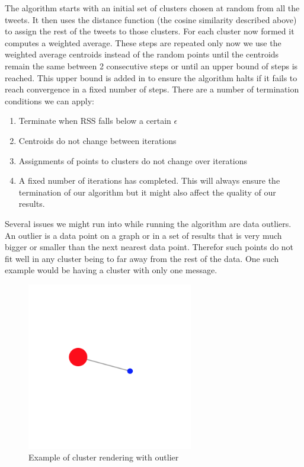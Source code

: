 The algorithm starts with an initial set of clusters chosen at random from all the tweets. It then uses the distance function (the cosine similarity described above) to assign the rest of the tweets to those clusters. For each cluster now formed it computes a weighted average. These steps are repeated only now we use the weighted average centroids instead of the random points until the centroids remain the same between 2 consecutive steps or until an upper bound of steps is reached. This upper bound is added in to ensure the algorithm halts if it fails to reach convergence in a fixed number of steps.
\newline
There are a number of termination conditions we can apply:
\begin{enumerate}
	\item Terminate when RSS falls below a certain $\epsilon$
	\item Centroids do not change between iterations
	\item Assignments of points to clusters do not change over iterations
	\item A fixed number of iterations has completed. This will always ensure the termination of our algorithm but it might also affect the quality of our results.
\end{enumerate}
Several issues we might run into while running the algorithm are data outliers. An outlier is a data point on a graph or in a set of results that is very much bigger or smaller than the next nearest data point. Therefor such points do not fit well in any cluster being to far away from the rest of the data. One such example would be having a cluster with only one message.
\newline 
\begin{figure}[ht!]
\centering
\includegraphics[resolution=300,keepaspectratio]{src/img/outlier.png}
\caption{Example of cluster rendering with outlier\label{overflow}}
\end{figure}
